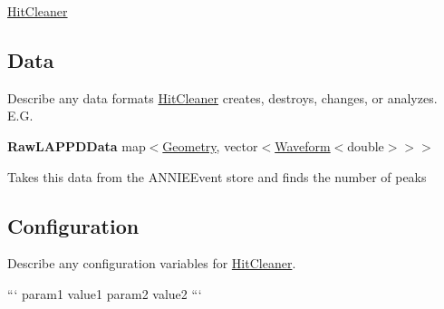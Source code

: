 \hyperlink{classHitCleaner}{Hit\-Cleaner}

\subsection*{Data}

Describe any data formats \hyperlink{classHitCleaner}{Hit\-Cleaner} creates, destroys, changes, or analyzes. E.\-G.

{\bfseries Raw\-L\-A\-P\-P\-D\-Data} {\ttfamily map$<$\hyperlink{classGeometry}{Geometry}, vector$<$\hyperlink{classWaveform}{Waveform}$<$double$>$$>$$>$}
\begin{DoxyItemize}
\item Takes this data from the {\ttfamily A\-N\-N\-I\-E\-Event} store and finds the number of peaks
\end{DoxyItemize}

\subsection*{Configuration}

Describe any configuration variables for \hyperlink{classHitCleaner}{Hit\-Cleaner}.

``` param1 value1 param2 value2 ``` 